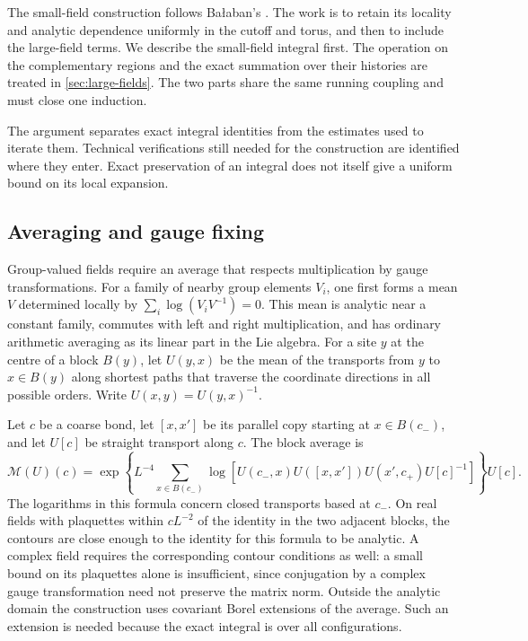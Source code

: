 \documentclass[11pt,letterpaper,reqno]{amsart}
\theoremstyle{definition}
\theoremstyle{remark}
\begin{document}
The small-field construction follows Ba\l aban's
\cite{Balaban1987}. The work is to retain its locality and analytic
dependence uniformly in the cutoff and torus, and then to include the
large-field terms. We describe the small-field integral first. The
operation on the complementary regions and the exact summation over
their histories are treated in \cref{sec:large-fields}. The two parts
share the same running coupling and must close one induction.

The argument separates exact integral identities from the estimates
used to iterate them. Technical verifications still needed for the
construction are identified where they enter. Exact preservation of
an integral does not itself give a uniform bound on its local expansion.

\subsection{Averaging and gauge fixing}

Group-valued fields require an average that respects multiplication by
gauge transformations. For a family of nearby group elements $V_i$,
one first forms a mean $V$ determined locally by
$\sum_i\log(V_iV^{-1})=0$. This mean is analytic near a constant
family, commutes with left and right multiplication, and has ordinary
arithmetic averaging as its linear part in the Lie algebra. For a site
$y$ at the centre of a block $B(y)$, let $U(y,x)$ be the mean of the
transports from $y$ to $x\in B(y)$ along shortest paths that traverse
the coordinate directions in all possible orders. Write
$U(x,y)=U(y,x)^{-1}$.

Let $c$ be a coarse bond, let $[x,x']$ be its parallel copy starting at
$x\in B(c_-)$, and let $U[c]$ be straight transport along $c$.
The block average is
\begin{equation}\label{eq:rg-average}
 \mathcal M(U)(c)=
 \exp\!\left\{L^{-4}\sum_{x\in B(c_-)}
 \log\!\left[
 U(c_-,x)U([x,x'])U(x',c_+)U[c]^{-1}\right]\right\}U[c].
\end{equation}
The logarithms in this formula concern closed transports based at
$c_-$. On real fields with plaquettes within $cL^{-2}$ of the identity
in the two adjacent blocks, the contours are close enough to the
identity for this formula to be analytic. A complex field requires the
corresponding contour conditions as well: a small bound on its
plaquettes alone is insufficient, since conjugation by a complex
gauge transformation need not preserve the matrix norm. Outside the analytic domain the construction
uses covariant Borel extensions of the average. Such an extension is
needed because the exact integral is over all configurations.
\end{document}
